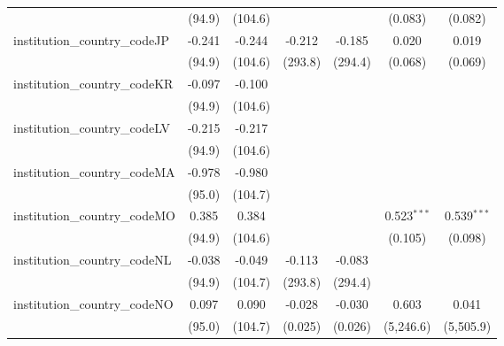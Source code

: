 \begin{tabular}{lcccccc}
                                         & (94.9)        & (104.6)       &               &               & (0.083)       & (0.082)\\   
   institution\_country\_codeJP          & -0.241        & -0.244        & -0.212        & -0.185        & 0.020         & 0.019\\   
                                         & (94.9)        & (104.6)       & (293.8)       & (294.4)       & (0.068)       & (0.069)\\   
   institution\_country\_codeKR          & -0.097        & -0.100        &               &               &               &   \\   
                                         & (94.9)        & (104.6)       &               &               &               &   \\   
   institution\_country\_codeLV          & -0.215        & -0.217        &               &               &               &   \\   
                                         & (94.9)        & (104.6)       &               &               &               &   \\   
   institution\_country\_codeMA          & -0.978        & -0.980        &               &               &               &   \\   
                                         & (95.0)        & (104.7)       &               &               &               &   \\   
   institution\_country\_codeMO          & 0.385         & 0.384         &               &               & 0.523$^{***}$ & 0.539$^{***}$\\   
                                         & (94.9)        & (104.6)       &               &               & (0.105)       & (0.098)\\   
   institution\_country\_codeNL          & -0.038        & -0.049        & -0.113        & -0.083        &               &   \\   
                                         & (94.9)        & (104.7)       & (293.8)       & (294.4)       &               &   \\   
   institution\_country\_codeNO          & 0.097         & 0.090         & -0.028        & -0.030        & 0.603         & 0.041\\   
                                         & (95.0)        & (104.7)       & (0.025)       & (0.026)       & (5,246.6)     & (5,505.9)\\   

\end{tabular}
